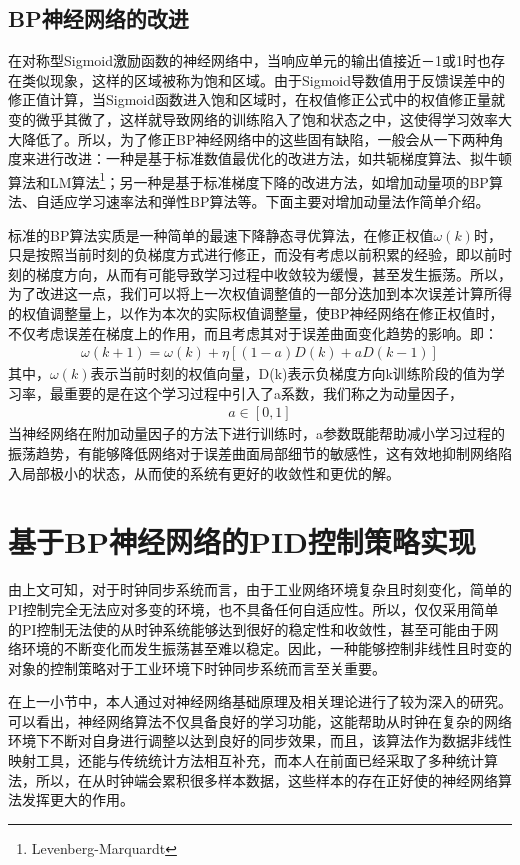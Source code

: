 \subsection{BP神经网络的改进}
在对称型Sigmoid激励函数的神经网络中，当响应单元的输出值接近－1或1时也存在类似现象，这样的区域被称为饱和区域。由于Sigmoid导数值用于反馈误差中的修正值计算，当Sigmoid函数进入饱和区域时，在权值修正公式中的权值修正量就变的微乎其微了，这样就导致网络的训练陷入了饱和状态之中，这使得学习效率大大降低了。所以，为了修正BP神经网络中的这些固有缺陷，一般会从一下两种角度来进行改进：一种是基于标准数值最优化的改进方法，如共轭梯度算法、拟牛顿算法和LM算法\footnote{Levenberg-Marquardt}；另一种是基于标准梯度下降的改进方法，如增加动量项的BP算法、自适应学习速率法和弹性BP算法等。下面主要对增加动量法作简单介绍。

标准的BP算法实质是一种简单的最速下降静态寻优算法，在修正权值$\omega(k)$时，只是按照当前时刻的负梯度方式进行修正，而没有考虑以前积累的经验，即以前时刻的梯度方向，从而有可能导致学习过程中收敛较为缓慢，甚至发生振荡。所以，为了改进这一点，我们可以将上一次权值调整值的一部分迭加到本次误差计算所得的权值调整量上，以作为本次的实际权值调整量，使BP神经网络在修正权值时，不仅考虑误差在梯度上的作用，而且考虑其对于误差曲面变化趋势的影响。即：
\begin{align}
	\omega(k+1) = \omega(k) + \eta[(1-a)D(k) + aD(k-1)]
\end{align}
其中，$\omega(k)$表示当前时刻的权值向量，D(k)表示负梯度方向k训练阶段的值为学习率，最重要的是在这个学习过程中引入了a系数，我们称之为动量因子，
\begin{align}
	a \in [0, 1]
\end{align}
当神经网络在附加动量因子的方法下进行训练时，a参数既能帮助减小学习过程的振荡趋势，有能够降低网络对于误差曲面局部细节的敏感性，这有效地抑制网络陷入局部极小的状态，从而使的系统有更好的收敛性和更优的解。

\section{基于BP神经网络的PID控制策略实现}
由上文可知，对于时钟同步系统而言，由于工业网络环境复杂且时刻变化，简单的PI控制完全无法应对多变的环境，也不具备任何自适应性。所以，仅仅采用简单的PI控制无法使的从时钟系统能够达到很好的稳定性和收敛性，甚至可能由于网络环境的不断变化而发生振荡甚至难以稳定。因此，一种能够控制非线性且时变的对象的控制策略对于工业环境下时钟同步系统而言至关重要。

在上一小节中，本人通过对神经网络基础原理及相关理论进行了较为深入的研究。可以看出，神经网络算法不仅具备良好的学习功能，这能帮助从时钟在复杂的网络环境下不断对自身进行调整以达到良好的同步效果，而且，该算法作为数据非线性映射工具，还能与传统统计方法相互补充，而本人在前面已经采取了多种统计算法，所以，在从时钟端会累积很多样本数据，这些样本的存在正好使的神经网络算法发挥更大的作用。

